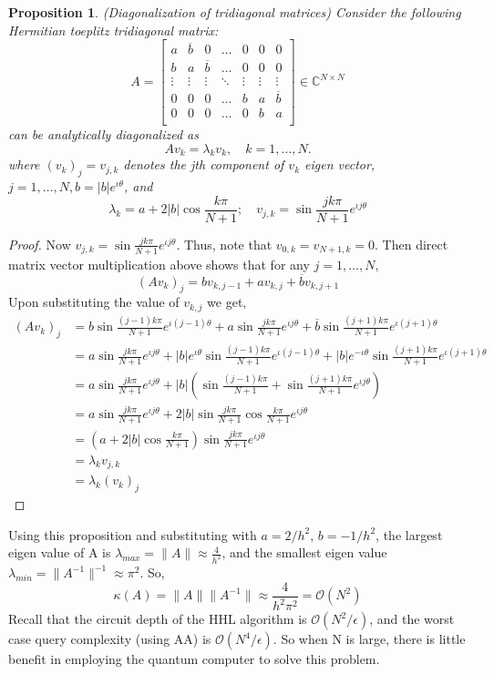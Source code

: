 \documentclass[12pt, oneside]{book}
\newtheorem{proposition}[theorem]{Proposition}
\theoremstyle{definition}
\theoremstyle{definition}
\theoremstyle{remark}
\begin{document}
\begin{proposition}
    (Diagonalization of tridiagonal matrices) Consider the following Hermitian toeplitz tridiagonal matrix:
    \[
    A=\begin{bmatrix} a &\overline{b} &0 &\ldots & 0 & 0 & 0 \\
    b & a & \overline{b} & \ldots & 0 & 0 & 0 \\
    \vdots & \vdots & \vdots & \ddots & \vdots &\vdots &\vdots \\
    0 & 0 & 0 & \ldots & b & a & \overline{b} \\
    0 & 0 & 0 & \ldots & 0 & b & a\\
    \end{bmatrix} \in \mathbb{C}^{N \times N}
    \]
    can be analytically diagonalized as
    \[
    Av_k=\lambda_kv_k, \quad k=1,\ldots,N.
    \]
    where $(v_k)_j=v_{j,k}$ denotes the jth component of $v_k$ eigen vector, $j=1,\ldots,N,b=|b|e^{\iota \theta}$, and
    \[
        \lambda_k=a+2|b| \cos \frac{k\pi}{N+1};\quad v_{j,k}=\sin \frac{jk\pi}{N+1}e^{\iota j\theta}
    \]
\end{proposition}
\begin{proof}
    Now $v_{j,k}=\sin \frac{jk\pi}{N+1}e^{\iota j\theta}$. Thus, note that $v_{0,k}=v_{N+1,k}=0$. Then direct matrix vector multiplication above shows that for any $j=1,\ldots, N$,
    \[
    (Av_k)_j=bv_{k,j-1}+av_{k,j}+\overline{b}v_{k,j+1}
    \]
    Upon substituting the value of $v_{k,j}$ we get,
    \begin{align*}
    (Av_k)_j&=b\sin \frac{(j-1)k\pi}{N+1}e^{\iota (j-1)\theta} + a \sin \frac{jk\pi}{N+1}e^{\iota j\theta} + \overline{b}\sin \frac{(j+1)k\pi}{N+1}e^{\iota (j+1)\theta}\\
    &=a \sin \frac{jk\pi}{N+1}e^{\iota j\theta} + |b|e^{\iota  \theta}\sin \frac{(j-1)k\pi}{N+1}e^{\iota (j-1)\theta}+|b|e^{-\iota \theta} \sin \frac{(j+1)k\pi}{N+1}e^{\iota (j+1)\theta}\\
    &=a\sin \frac{jk\pi}{N+1}e^{\iota j\theta} +|b|\left(\sin \frac{(j-1)k\pi}{N+1}+\sin \frac{(j+1)k\pi}{N+1}e^{\iota j\theta} \right)\\
    &=a\sin \frac{jk\pi}{N+1}e^{\iota j\theta} +2|b|\sin\frac{jk\pi}{N+1} \cos \frac{k\pi}{N+1}e^{\iota j\theta}\\
    &=\left(a+2|b|\cos \frac{k\pi}{N+1}\right) \sin \frac{jk\pi}{N+1}e^{\iota j\theta}\\
    &=\lambda_k v_{j,k}\\
    &=\lambda_k (v_{k})_j
    \end{align*}
\end{proof}
Using this proposition and substituting with $a=2/h^2$, $b=-1/h^2$, the largest eigen value of A is $\lambda_{max}=\|A\|\approx \frac{4}{h^2}$, and the smallest eigen value $\lambda_{min}=\|A^{-1}\|^{-1} \approx \pi^2$. So,
\[
\kappa(A)=\|A\|\|A^{-1}\|\approx \frac{4}{h^2\pi^2} = \mathcal{O}(N^2)
\]
Recall that the circuit depth of the HHL algorithm is $\mathcal{O}(N^2/\epsilon)$, and the worst case query complexity (using AA) is $\mathcal{O}(N^4/\epsilon)$. So when N is large, there is little benefit in employing the quantum computer to solve this problem. 
\end{document}
